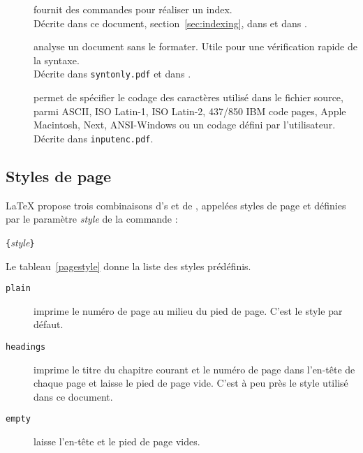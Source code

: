 \begin{table}[!tbp]
\begin{lined}{\textwidth}
\begin{description}
\item[\normalfont{}] fournit des commandes pour réaliser
  un index.\\
  Décrite dans ce document, section~\ref{sec:indexing}, dans
  \companion{} et dans \desgraupes{}.

\item[\normalfont{}] analyse un document sans le
  formater. Utile pour une vérification rapide de la syntaxe.\\
  Décrite dans \texttt{syntonly.pdf} et dans \companion{}.

\item[\normalfont{}] permet de spécifier le codage des
  caractères utilisé dans le fichier source, parmi ASCII, ISO Latin-1,
  ISO Latin-2, 437/850 IBM code pages,  Apple Macintosh, Next,
  ANSI-Windows ou un codage défini par l'utilisateur.\\
  Décrite dans \texttt{inputenc.pdf}.
\end{description}
\end{lined}
\end{table}


\subsection{Styles de page}

\LaTeX{} propose trois combinaisons d's et de , appelées styles de page et définies par le paramètre \emph{style} de la
commande :
\begin{lscommand}
\verb|{|\emph{style}\verb|}|
\end{lscommand}
Le tableau~\ref{pagestyle}
donne la liste des styles prédéfinis.

\begin{table}[!hbp]
\caption{Les styles de page de \LaTeX} \label{pagestyle}
\begin{lined}{\textwidth}
\begin{description}

\item[\normalfont\texttt{plain}] imprime le numéro de page au milieu
du pied de page. C'est le style par défaut.

\item[\normalfont\texttt{headings}] imprime le titre du chapitre
courant et le numéro de page dans l'en-tête de chaque page et laisse le
pied de page vide. C'est à peu près le style utilisé dans ce document.

\item[\normalfont\texttt{empty}] laisse l'en-tête et le pied de page
vides.
\end{description}
\end{lined}
\end{table}

